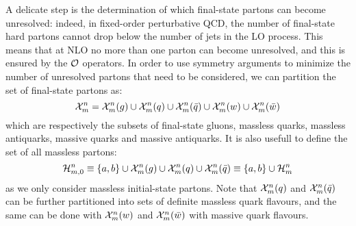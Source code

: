A delicate step is the determination of which final-state partons can become unresolved: indeed, in fixed-order perturbative QCD, the number of final-state hard partons cannot drop below the number of jets in the LO process. This means that at NLO no more than one parton can become unresolved, and this is ensured by the $ \mathcal{O} $ operators. In order to use symmetry arguments to minimize the number of unresolved partons that need to be considered, we can partition the set of final-state partons as:
\begin{equation*}
  \mathcal{X}^{n}_{m} = \mathcal{X}^{n}_{m}(g) \cup \mathcal{X}^{n}_{m}(q) \cup \mathcal{X}^{n}_{m}(\bar{q}) \cup \mathcal{X}^{n}_{m}(w) \cup \mathcal{X}^{n}_{m}(\bar{w})
\end{equation*}
which are respectively the subsets of final-state gluons, massless quarks, massless antiquarks, massive quarks and massive antiquarks. It is also usefull to define the set of all massless partons:
\begin{equation*}
  \mathcal{H}^{n}_{m,0} \equiv \{a,b\} \cup \mathcal{X}^{n}_{m}(g) \cup \mathcal{X}^{n}_{m}(q) \cup \mathcal{X}^{n}_{m}(\bar{q}) \equiv \{a,b\} \cup \mathcal{H}^{n}_{m}
\end{equation*}
as we only consider massless initial-state partons. Note that $ \mathcal{X}^{n}_{m}(q) $ and $ \mathcal{X}^{n}_{m}(\bar{q}) $ can be further partitioned into sets of definite massless quark flavours, and the same can be done with $ \mathcal{X}^{n}_{m}(w) $ and $ \mathcal{X}^{n}_{m}(\bar{w}) $ with massive quark flavours.

